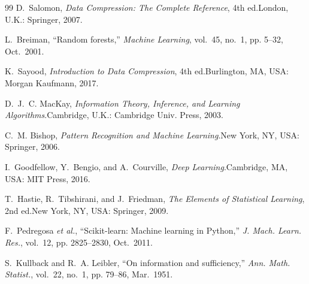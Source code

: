 \documentclass[conference]{IEEEtran}
\begin{document}
\begin{thebibliography}{99}
D.~Salomon, \emph{Data Compression: The Complete Reference}, 4th ed.\quad London, U.K.: Springer, 2007.

L.~Breiman, ``Random forests,'' \emph{Machine Learning}, vol.~45, no.~1, pp. 5--32, Oct.\ 2001.

K.~Sayood, \emph{Introduction to Data Compression}, 4th ed.\quad Burlington, MA, USA: Morgan Kaufmann, 2017.

D.~J.~C. MacKay, \emph{Information Theory, Inference, and Learning Algorithms}.\quad Cambridge, U.K.: Cambridge Univ. Press, 2003.

C.~M. Bishop, \emph{Pattern Recognition and Machine Learning}.\quad New York, NY, USA: Springer, 2006.

I.~Goodfellow, Y.~Bengio, and A.~Courville, \emph{Deep Learning}.\quad Cambridge, MA, USA: MIT Press, 2016.

T.~Hastie, R.~Tibshirani, and J.~Friedman, \emph{The Elements of Statistical Learning}, 2nd ed.\quad New York, NY, USA: Springer, 2009.

F.~Pedregosa \emph{et al.}, ``Scikit-learn: Machine learning in Python,'' \emph{J. Mach. Learn. Res.}, vol.~12, pp. 2825--2830, Oct.\ 2011.

S.~Kullback and R.~A. Leibler, ``On information and sufficiency,'' \emph{Ann. Math. Statist.}, vol.~22, no.~1, pp. 79--86, Mar.\ 1951.

\end{thebibliography}
\end{document}
